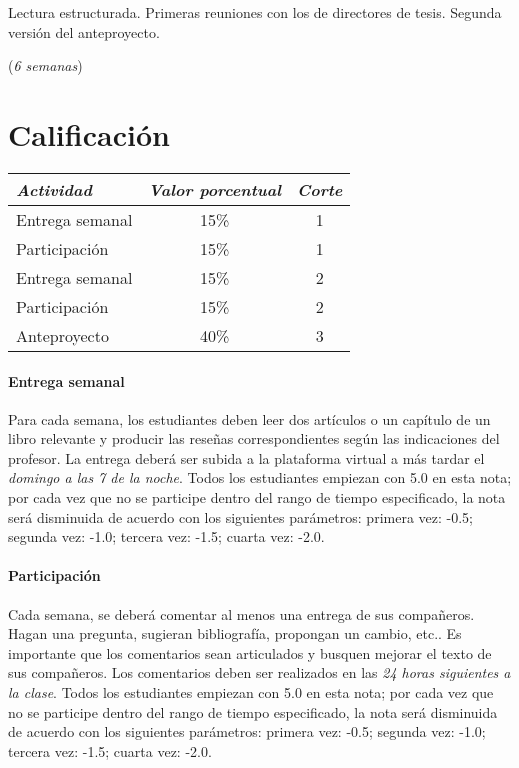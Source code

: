 \documentclass[]{article}
\let\oldparagraph\paragraph
\renewcommand{\paragraph}[1]{\oldparagraph{#1}\mbox{}}
\begin{document}
Lectura estructurada. Primeras reuniones con los de directores de tesis.
Segunda versión del anteproyecto.

(\emph{6 semanas})

\section{Calificación}\label{calificacion}

\begin{longtable}[]{@{}lcc@{}}
\toprule
\emph{Actividad} & \emph{Valor porcentual} & \emph{Corte}\tabularnewline
\midrule
\endhead
Entrega semanal & 15\% & 1\tabularnewline
Participación & 15\% & 1\tabularnewline
Entrega semanal & 15\% & 2\tabularnewline
Participación & 15\% & 2\tabularnewline
Anteproyecto & 40\% & 3\tabularnewline
\bottomrule
\end{longtable}

\paragraph{Entrega semanal}\label{entrega-semanal}

Para cada semana, los estudiantes deben leer dos artículos o un capítulo
de un libro relevante y producir las reseñas correspondientes según las
indicaciones del profesor. La entrega deberá ser subida a la plataforma
virtual a más tardar el \emph{domingo a las 7 de la noche}. Todos los
estudiantes empiezan con 5.0 en esta nota; por cada vez que no se
participe dentro del rango de tiempo especificado, la nota será
disminuida de acuerdo con los siguientes parámetros: primera vez: -0.5;
segunda vez: -1.0; tercera vez: -1.5; cuarta vez: -2.0.

\paragraph{Participación}\label{participacion}

Cada semana, se deberá comentar al menos una entrega de sus compañeros.
Hagan una pregunta, sugieran bibliografía, propongan un cambio, etc.. Es
importante que los comentarios sean articulados y busquen mejorar el
texto de sus compañeros. Los comentarios deben ser realizados en las
\emph{24 horas siguientes a la clase}. Todos los estudiantes empiezan
con 5.0 en esta nota; por cada vez que no se participe dentro del rango
de tiempo especificado, la nota será disminuida de acuerdo con los
siguientes parámetros: primera vez: -0.5; segunda vez: -1.0; tercera
vez: -1.5; cuarta vez: -2.0.
\end{document}
